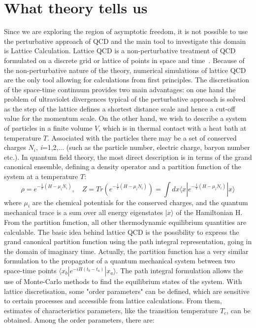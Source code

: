 \section{What theory tells us}
Since we are exploring the region of asymptotic freedom, it is not possible to use the perturbative approach 
of QCD and the main tool to investigate this domain is Lattice Calculation. Lattice QCD is a non-perturbative 
treatment of QCD formulated on a discrete grid or lattice of points in space and time~\cite{Philipsen:2012nu}. 
Because of the non-perturbative nature of the theory, numerical simulations of lattice QCD are the only tool 
allowing for calculations from first principles. The discretisation of the space-time continuum provides two main 
advantages: on one hand the problem of ultraviolet divergences typical of the perturbative approach is solved 
as the step of the lattice defines a shortest distance scale and hence a cut-off value for the momentum scale. 
On the other hand, we wish to describe a system of particles in a finite volume $V$, which is in thermal contact 
with a heat bath at temperature $T$. Associated with the particles there may be a set of conserved charges 
$N_i$, \textit{i}=1,2,... (such as the particle number, electric charge, baryon number etc.). In quantum field 
theory, the most direct description is in terms of the grand canonical ensemble, defining a density operator 
and a partition function of the system at a temperature $T$:
\begin{equation}
\rho =e^{-\frac{1}{T}(H-\mu_iN_i)},\quad Z=Tr(e^{-\frac{1}{T}(H-\mu_iN_i)})=  \int dx \langle x|e^{-\frac{1}{T}(H-\mu_iN_i)}|x\rangle
\end{equation}
where $\mu_i$ are the chemical potentials for the conserved charges, and the quantum mechanical trace is a sum over 
all energy eigenstates $|x\rangle$ of the Hamiltonian H. 
From the partition function, all other thermodynamic equilibrium quantities are calculable. The basic idea behind lattice 
QCD is the possibility to express the grand canonical partition function using the path integral representation, going in the 
domain of imaginary time. Actually, the partition function has a very similar formulation to the propagator of a quantum 
mechanical system between two space-time points $\langle x_b|e^{-iH(t_b-t_a)}|x_a\rangle$. The path integral 
formulation allows the use of Monte-Carlo methods to find the equilibrium states of the system. 
With lattice discretisation, some "order parameters" can be defined, which are sensitive to certain processes and accessible from lattice calculations. From them, estimates of characteristics parameters, like the transition temperature $T_c$, can be obtained. Among the order parameters, there are:
